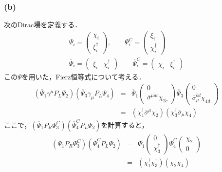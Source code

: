 \subsubsection{(b)}
次のDirac場を定義する．
\begin{eqnarray}
\Psi_i=\left(\begin{array}{c}\chi_i \\ \xi^{\dagger}_i \end{array}\right),\qquad \Psi_i^{C}=\left(\begin{array}{c}\xi_i \\ \chi^{\dagger}_i \end{array}\right) \\
\overline{\Psi}_i=\left(\begin{array}{cc}\xi_i & \chi^{\dagger}_i\end{array}\right)\qquad \overline{\Psi}_i^{C}=\left(\begin{array}{cc}\chi_i & \xi^{\dagger}_i\end{array}\right)
\end{eqnarray}
この$\Psi$を用いた，Fierz恒等式について考える．
\begin{eqnarray}
(\overline{\Psi}_{1}\gamma^{\mu}P_L\Psi_{2})(\overline{\Psi}_{3}\gamma_{\mu}P_L\Psi_{4})&=&\overline{\Psi}_{1}\left(\begin{array}{c}0 \\ \overline{\sigma}^{\mu \dot{a}c}\chi_{2c}\end{array}\right)\overline{\Psi}_{3}\left(\begin{array}{c}0 \\ \overline{\sigma}_{\mu}^{\dot{b}d}\chi_{4d}\end{array}\right) \\
\label{A133}
&=&(\chi_{1}^{\dagger}\overline{\sigma}^{\mu}\chi_{2})(\chi_{3}^{\dagger}\overline{\sigma}_{\mu}\chi_{4})
\end{eqnarray}
ここで，$(\overline{\Psi}_{1}P_R\Psi_{3}^{C})(\overline{\Psi}_{4}^{C}P_L\Psi_{2})$を計算すると，
\begin{eqnarray}
(\overline{\Psi}_{1}P_R\Psi_{3}^{C})(\overline{\Psi}_{4}^{C}P_L\Psi_{2})&=&\overline{\Psi}_{1}\left(\begin{array}{c}0 \\ \chi^{\dagger}_{3}\end{array}\right)\overline{\Psi}^{C}_{4}\left(\begin{array}{c}\chi_2 \\ 0\end{array}\right) \\
\label{A135}
&=&(\chi_{1}^{\dagger}\chi_{3}^{\dagger})(\chi_{2}\chi_{4})
\end{eqnarray}
